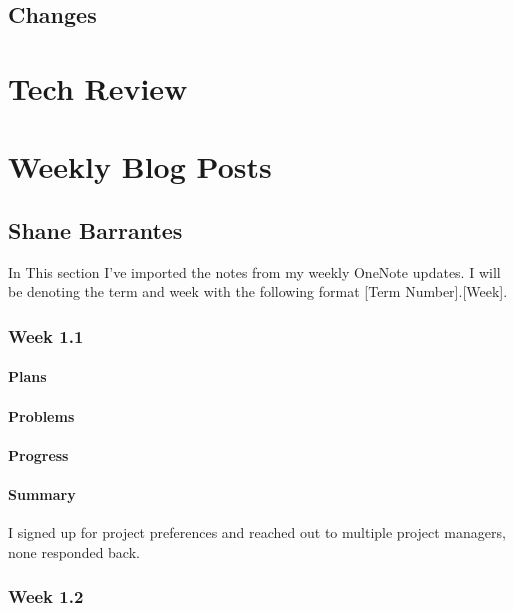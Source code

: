 \documentclass[onecolumn, draftclsnofoot,10pt, compsoc]{article}
\begin{document}
    \subsection{Changes}
        
\section{Tech Review}
	

\section{Weekly Blog Posts}
    \subsection{Shane Barrantes}
        In This section I've imported the notes from my weekly OneNote updates. I will be denoting the term and week with the following format [Term Number].[Week].
        
        \subsubsection{Week 1.1}
		    
		    \paragraph{Plans} \hfill \break

		    \paragraph{Problems} \hfill \break

		    \paragraph{Progress} \hfill \break

		    \paragraph{Summary} \hfill \break
		         I signed up for project preferences and reached out to multiple project managers, none responded back. \\
		         
		\subsubsection{Week 1.2}
		
\end{document}
